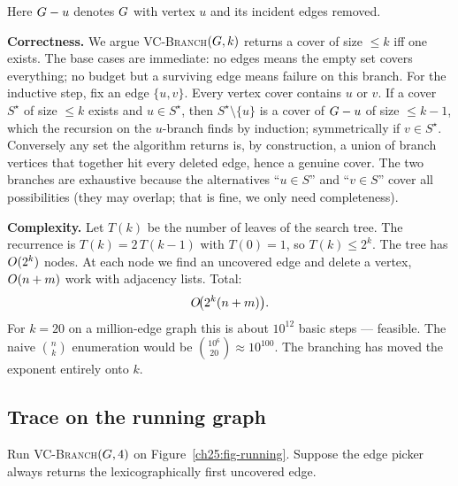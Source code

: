 Here $G - u$ denotes $G$ with vertex $u$ and its incident edges removed.

\begin{whybox}
\textbf{Correctness.} We argue \textsc{VC-Branch}$(G,k)$ returns a cover of size $\le k$ iff one exists. The base cases are immediate: no edges means the empty set covers everything; no budget but a surviving edge means failure on this branch. For the inductive step, fix an edge $\{u,v\}$. Every vertex cover contains $u$ or $v$. If a cover $S^\star$ of size $\le k$ exists and $u\in S^\star$, then $S^\star\setminus\{u\}$ is a cover of $G-u$ of size $\le k-1$, which the recursion on the $u$-branch finds by induction; symmetrically if $v\in S^\star$. Conversely any set the algorithm returns is, by construction, a union of branch vertices that together hit every deleted edge, hence a genuine cover. The two branches are exhaustive because the alternatives ``$u\in S$'' and ``$v\in S$'' cover all possibilities (they may overlap; that is fine, we only need completeness).
\end{whybox}

\begin{whybox}
\textbf{Complexity.} Let $T(k)$ be the number of leaves of the search tree. The recurrence is $T(k) = 2\,T(k-1)$ with $T(0)=1$, so $T(k)\le 2^k$. The tree has $O(2^k)$ nodes. At each node we find an uncovered edge and delete a vertex, $O(n+m)$ work with adjacency lists. Total:
\[
  O\!\big(2^k (n+m)\big).
\]
For $k=20$ on a million-edge graph this is about $10^{12}$ basic steps --- feasible. The naive $\binom{n}{k}$ enumeration would be $\binom{10^6}{20}\approx 10^{100}$. The branching has moved the exponent entirely onto $k$.
\end{whybox}

\subsection{Trace on the running graph}

Run \textsc{VC-Branch}$(G,4)$ on Figure~\ref{ch25:fig-running}. Suppose the edge picker always returns the lexicographically first uncovered edge.

